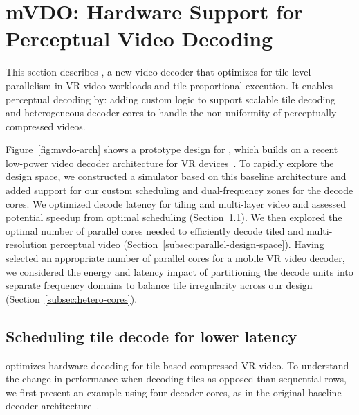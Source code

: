 
\section{{mVDO}: Hardware Support for Perceptual Video Decoding}
\label{sec:vdo-hw}

This section describes \nameArch, a new video decoder that optimizes for tile-level parallelism in VR video workloads and tile-proportional execution.
It enables perceptual decoding by: adding custom logic to support scalable tile decoding and heterogeneous decoder cores to handle the non-uniformity of perceptually compressed videos.

\vdoOverview

Figure~\ref{fig:mvdo-arch} shows a prototype design for \nameArch, which builds on a recent low-power video decoder architecture for VR devices~\cite{tikekar18ijssc}.
To rapidly explore the design space, we constructed a simulator based on this baseline architecture and added support for our custom scheduling and dual-frequency zones for the decode cores.
We optimized decode latency for tiling and multi-layer video and assessed potential speedup from optimal scheduling (Section~\ref{subsec:tile-sched}).
We then explored the optimal number of parallel cores needed to efficiently decode tiled and multi-resolution perceptual video (Section~\ref{subsec:parallel-design-space}).
Having selected an appropriate number of parallel cores for a mobile VR video decoder, we considered the energy and latency impact of partitioning the decode units into separate frequency domains to balance tile irregularity across our design (Section~\ref{subsec:hetero-cores}).

\subsection{Scheduling tile decode for lower latency}
\label{subsec:tile-sched}
\nameArch optimizes hardware decoding for tile-based compressed VR video.
To understand the change in performance when decoding tiles as opposed than sequential rows, we first present an example using four decoder cores, as in the original baseline decoder architecture~\cite{hevcThesis}.


\vdecCTUTimingFigure

